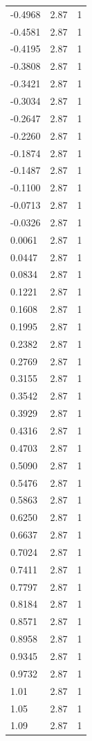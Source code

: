 \begin{longtable}{lrr}
  -0.4968 & 2.87 & 1 \\
  -0.4581 & 2.87 & 1 \\
  -0.4195 & 2.87 & 1 \\
  -0.3808 & 2.87 & 1 \\
  -0.3421 & 2.87 & 1 \\
  -0.3034 & 2.87 & 1 \\
  -0.2647 & 2.87 & 1 \\
  -0.2260 & 2.87 & 1 \\
  -0.1874 & 2.87 & 1 \\
  -0.1487 & 2.87 & 1 \\
  -0.1100 & 2.87 & 1 \\
  -0.0713 & 2.87 & 1 \\
  -0.0326 & 2.87 & 1 \\
  0.0061 & 2.87 & 1 \\
  0.0447 & 2.87 & 1 \\
  0.0834 & 2.87 & 1 \\
  0.1221 & 2.87 & 1 \\
  0.1608 & 2.87 & 1 \\
  0.1995 & 2.87 & 1 \\
  0.2382 & 2.87 & 1 \\
  0.2769 & 2.87 & 1 \\
  0.3155 & 2.87 & 1 \\
  0.3542 & 2.87 & 1 \\
  0.3929 & 2.87 & 1 \\
  0.4316 & 2.87 & 1 \\
  0.4703 & 2.87 & 1 \\
  0.5090 & 2.87 & 1 \\
  0.5476 & 2.87 & 1 \\
  0.5863 & 2.87 & 1 \\
  0.6250 & 2.87 & 1 \\
  0.6637 & 2.87 & 1 \\
  0.7024 & 2.87 & 1 \\
  0.7411 & 2.87 & 1 \\
  0.7797 & 2.87 & 1 \\
  0.8184 & 2.87 & 1 \\
  0.8571 & 2.87 & 1 \\
  0.8958 & 2.87 & 1 \\
  0.9345 & 2.87 & 1 \\
  0.9732 & 2.87 & 1 \\
  1.01 & 2.87 & 1 \\
  1.05 & 2.87 & 1 \\
  1.09 & 2.87 & 1 \\

\end{longtable}
